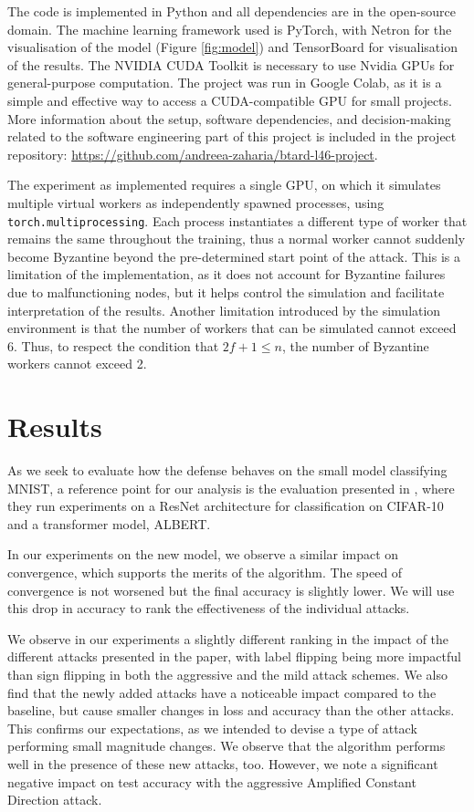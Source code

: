 \documentclass{article}
\begin{document}
The code is implemented in Python and all dependencies are in the open-source domain. The machine learning framework used is PyTorch, with Netron for the visualisation of the model (Figure \ref{fig:model}) and TensorBoard for visualisation of the results. The NVIDIA CUDA Toolkit is necessary to use Nvidia GPUs for general-purpose computation. The project was run in Google Colab, as it is a simple and effective way to access a CUDA-compatible GPU for small projects. More information about the setup, software dependencies, and decision-making related to the software engineering part of this project is included in the project repository: \url{https://github.com/andreea-zaharia/btard-l46-project}.

The experiment as implemented requires a single GPU, on which it simulates multiple virtual workers as independently spawned processes, using \texttt{torch.multiprocessing}. Each process instantiates a different type of worker that remains the same throughout the training, thus a normal worker cannot suddenly become Byzantine beyond the pre-determined start point of the attack. This is a limitation of the implementation, as it does not account for Byzantine failures due to malfunctioning nodes, but it helps control the simulation and facilitate interpretation of the results. Another limitation introduced by the simulation environment is that the number of workers that can be simulated cannot exceed 6. Thus, to respect the condition that $2f + 1 \leq n$, the number of Byzantine workers cannot exceed 2.

\section{Results}
As we seek to evaluate how the defense behaves on the small model classifying MNIST, a reference point for our analysis is the evaluation presented in \cite{gorbunov2021secure}, where they run experiments on a ResNet architecture for classification on CIFAR-10 and a transformer model, ALBERT. 

In our experiments on the new model, we observe a similar impact on convergence, which supports the merits of the algorithm. The speed of convergence is not worsened but the final accuracy is slightly lower. We will use this drop in accuracy to rank the effectiveness of the individual attacks.

We observe in our experiments a slightly different ranking in the impact of the different attacks presented in the paper, with label flipping being more impactful than sign flipping in both the aggressive and the mild attack schemes. We also find that the newly added attacks have a noticeable impact compared to the baseline, but cause smaller changes in loss and accuracy than the other attacks. This confirms our expectations, as we intended to devise a type of attack performing small magnitude changes. We observe that the algorithm performs well in the presence of these new attacks, too. However, we note a significant negative impact on test accuracy with the aggressive Amplified Constant Direction attack.
\end{document}
